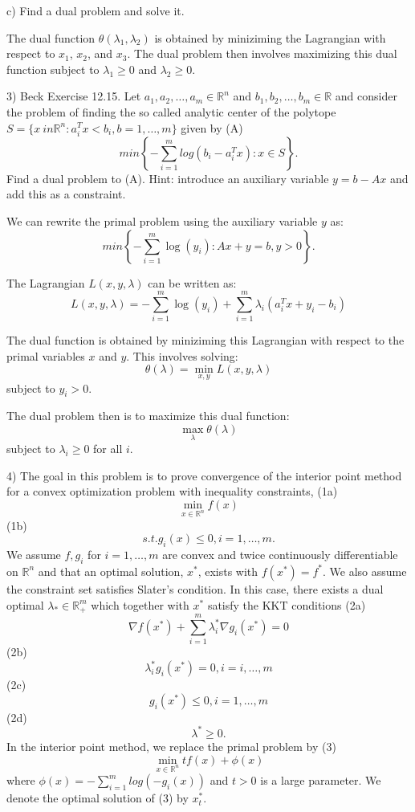 \documentclass{article}
\newcommand{\RR}{\mathbb{R}}
\begin{document}
c) Find a dual problem and solve it.

The dual function $\theta(\lambda_1, \lambda_2)$ is obtained by miniziming
the Lagrangian with respect to $x_1$, $x_2$, and $x_3$.
The dual problem then involves maximizing this dual function subject to
$\lambda_1 \geq 0$ and $\lambda_2 \geq 0$.


3) Beck Exercise 12.15. Let $a_1, a_2, \dots, a_m \in \RR^n$ and $b_1, b_2, \dots, b_m \in \RR$ and consider the problem of finding the so called analytic center of the polytope $S = \{x \ in \RR^n : a_i^T x < b_i, b = 1, \dots, m\}$ given by
(A) \[min \left\{ - \sum_{i=1}^m log(b_i - a_i^T x) : x \in S \right\}.\]
Find a dual problem to (A). Hint: introduce an auxiliary variable $y = b - Ax$ and add this as a constraint.

We can rewrite the primal problem using the auxiliary variable $y$ as:
\[min \left\{-\sum_{i=1}^{m} \log(y_i) : Ax + y = b, y > 0\right\}.\]

The Lagrangian $L(x, y, \lambda)$ can be written as:
\[L(x, y, \lambda) = -\sum_{i=1}^{m} \log(y_i) + \sum_{i=1}^{m} \lambda_i(a_i^T x + y_i - b_i)\]

The dual function is obtained by miniziming this Lagrangian with respect to the primal
variables $x$ and $y$. This involves solving:
\[\theta(\lambda) = \min_{x, y} L(x, y, \lambda)\]
subject to $y_i > 0$.

The dual problem then is to maximize this dual function:
\[\max_{\lambda} \theta(\lambda)\]
subject to $\lambda_i \geq 0$ for all $i$.


4) The goal in this problem is to prove convergence of the interior point method for a convex optimization problem with inequality constraints,
(1a) \[\min_{x \in \RR^n} f(x)\]
(1b) \[s.t. g_i(x) \leq 0, i = 1, \dots, m.\]
We assume $f, g_i$ for $i = 1, \dots, m$ are convex and twice continuously differentiable on $\RR^n$ and that an optimal solution, $x^{*}$, exists with $f(x^{*}) = f^{*}$. We also assume the constraint set satisfies Slater's condition. In this case, there exists a dual optimal $\lambda_{*} \in \RR_{+}^m$ which together with $x^{*}$ satisfy the KKT conditions
(2a) \[\nabla f(x^{*}) + \sum_{i=1}^m \lambda_i^{*} \nabla g_i(x^{*}) = 0\]
(2b) \[\lambda_i^{*} g_i(x^{*}) = 0, i = i, \dots, m\]
(2c) \[g_i(x^{*}) \leq 0, i = 1, \dots, m\]
(2d) \[\lambda^{*} \geq 0.\]
In the interior point method, we replace the primal problem by
(3) \[\min_{x \in \RR^n} t f(x) + \phi(x)\]
where $\phi(x) = - \sum_{i=1}^m log(-g_i(x))$ and $t > 0$ is a large parameter. We denote the optimal solution of (3) by $x_t^{*}$.
\end{document}
